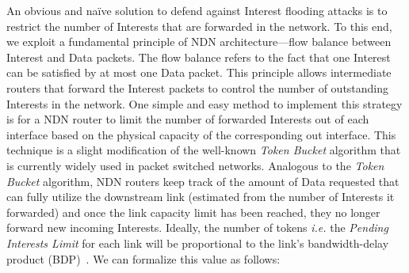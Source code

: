 




An obvious and na\"ive solution to defend against Interest flooding attacks is to restrict the number of Interests that are forwarded in the network. To this end, we exploit a 
 fundamental principle of NDN architecture---flow balance between Interest and Data packets. The flow balance refers to the fact that one Interest can be satisfied by at most one Data packet. This principle allows intermediate routers that forward the Interest packets to control the number of outstanding Interests in the network. 
One simple and easy method to implement this strategy is for a NDN router to limit the number of forwarded Interests out of each interface based on the physical capacity of the corresponding out interface. This technique is a slight modification of the well-known {\it Token Bucket} algorithm that is currently widely used in packet switched networks. Analogous to the {\it Token Bucket} algorithm, NDN routers keep track of the amount of Data requested that can fully utilize the downstream link (estimated from the number of Interests it forwarded) and once the link capacity limit has been reached, they no longer forward new incoming Interests. Ideally, the number of tokens {\it i.e.} the \emph{Pending Interests Limit} for each link will be proportional to the link's bandwidth-delay product (BDP)~\cite{tcp-survey}. We can formalize this value as follows:

